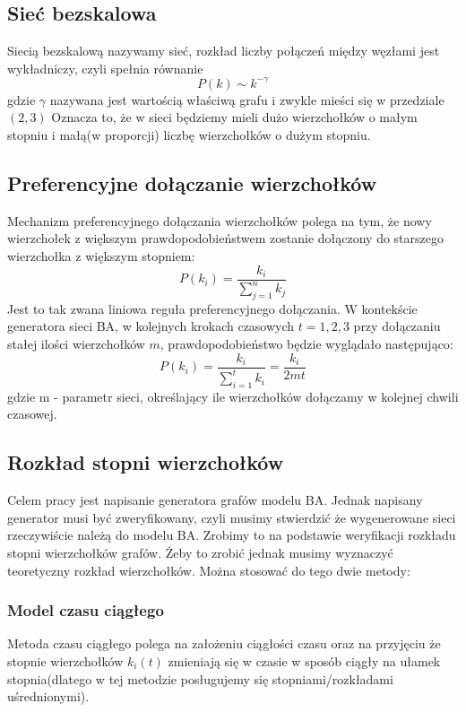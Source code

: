 \documentclass{article}
\begin{document}
\subsection{Sieć bezskalowa}
Siecią bezskalową nazywamy sieć, rozkład liczby połączeń między węzłami jest wykładniczy, czyli spełnia równanie 
	\begin{equation}
		P(k) \sim k^{-\gamma}
	\end{equation}
gdzie $\gamma$ nazywana jest wartością właściwą grafu i zwykle mieści się w przedziale $ (2,3)$  
Oznacza to, że w sieci będziemy mieli dużo wierzchołków o małym stopniu i małą(w proporcji) liczbę wierzchołków o dużym stopniu.
\subsection{Preferencyjne dołączanie wierzchołków}
Mechanizm preferencyjnego dołączania wierzchołków polega na tym, że nowy wierzchołek z większym prawdopodobieństwem zostanie dołączony do starszego wierzchołka z większym stopniem:
\begin{equation}
	P(k_i) = \frac{k_i}{ \sum_{ j = 1 }^{n} k_j }
\end{equation}
Jest to tak zwana liniowa reguła preferencyjnego dołączania. W kontekście generatora sieci BA, w kolejnych krokach czasowych $t = 1,2,3$ przy dołączaniu stałej ilości wierzchołków $m$, prawdopodobieństwo będzie wyglądało następująco:
\begin{equation}
	P(k_i) = \frac{k_i}{ \sum_{ i = 1 }^{t} k_i } = \frac{k_i} {2mt}
\end{equation}
	gdzie m - parametr sieci, określający ile wierzchołków dołączamy w kolejnej chwili czasowej.
\subsection{Rozkład stopni wierzchołków}
	Celem pracy jest napisanie generatora grafów modelu BA. Jednak napisany generator musi być zweryfikowany, czyli musimy stwierdzić że wygenerowane sieci rzeczywiście należą do modelu BA. Zrobimy to na podstawie weryfikacji rozkładu stopni wierzchołków grafów. Żeby to zrobić jednak musimy wyznaczyć teoretyczny rozkład wierzchołków. Można stosować do tego dwie metody:
\subsubsection{Model czasu ciągłego}
	Metoda czasu ciągłego polega na założeniu ciągłości czasu oraz na przyjęciu że stopnie wierzchołków $k_i(t)$ zmieniają się w czasie w sposób ciągły na ułamek stopnia(dlatego w tej metodzie posługujemy się stopniami/rozkładami uśrednionymi).
\end{document}
